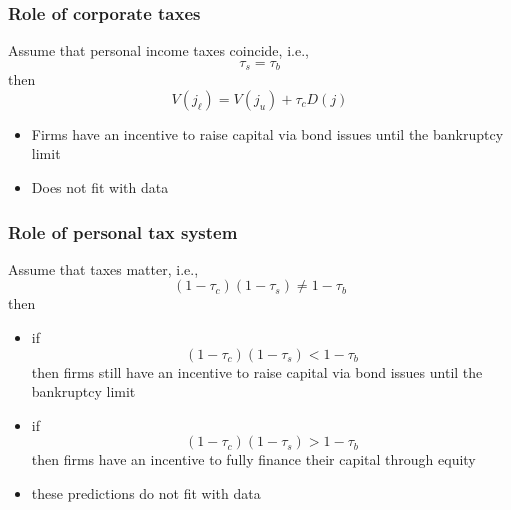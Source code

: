 \documentclass[blue]{beamer}
\theoremstyle{definition}
\theoremstyle{example}
\begin{document}

\begin{frame}\frametitle{Role of corporate taxes}

Assume that personal income taxes coincide, i.e.,
\[
\tau_s = \tau_b
\]
then
\[
V(j_\ell) = V(j_u) + \tau_c D(j)
\]
\begin{itemize}
\item Firms have an incentive to raise capital via bond issues until the bankruptcy limit
\item Does not fit with data
\end{itemize}

\end{frame}


\begin{frame}\frametitle{Role of personal tax system}

Assume that taxes matter, i.e.,
\[
(1-\tau_c)(1-\tau_s) \neq 1-\tau_b
\]
then
\begin{itemize}
\item if
\[
(1-\tau_c)(1-\tau_s) < 1-\tau_b
\]
then firms still have an incentive to raise capital via bond issues until the bankruptcy limit
\item if
\[
(1-\tau_c)(1-\tau_s) > 1-\tau_b
\]
then firms have an incentive to fully finance their capital through equity
\item these predictions do not fit with data
\end{itemize}

\end{frame}

\end{document}
